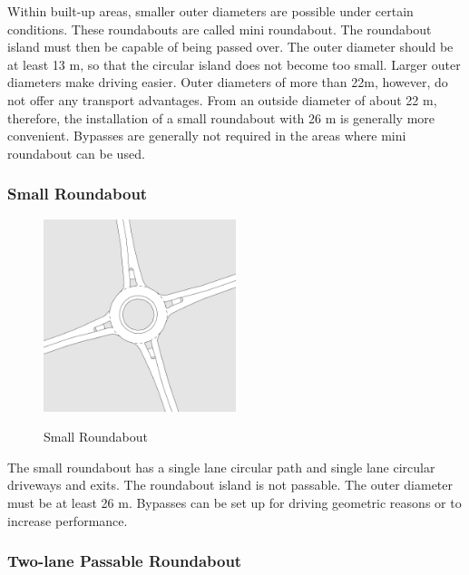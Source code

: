 Within built-up areas, smaller outer diameters are possible under certain conditions.
These roundabouts are called mini roundabout. The roundabout island must then be capable of being passed over.
The outer diameter should be at least 13 m, so that the circular island does not become too small.
Larger outer diameters make driving easier. Outer diameters of more than 22m, however, do not offer any transport advantages.
From an outside diameter of about 22 m, therefore, the installation of a small roundabout with 26 m is generally more convenient.
Bypasses are generally not required in the areas where mini roundabout can be used.


\subsubsection{Small Roundabout}
\label{smal_roundabout}

\begin{figure}[!ht]
\caption{Small Roundabout \cite{man06}}
\includegraphics[width=0.5\textwidth]{bilder/small_roundabout.png} %
\label{roundabout_small}
\end{figure}

The small roundabout has a single lane circular path and single lane circular driveways and exits. The roundabout island is not passable.
The outer diameter must be at least 26 m. Bypasses can be set up for driving geometric reasons or to increase performance.


\subsubsection{Two-lane Passable Roundabout}

